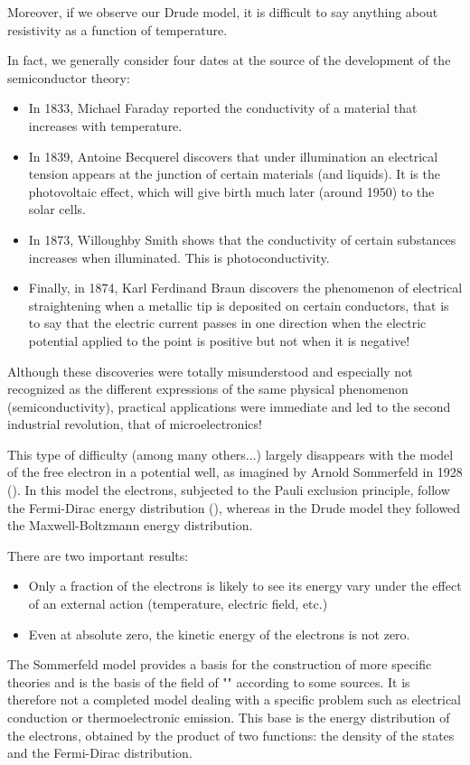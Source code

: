 	Moreover, if we observe our Drude model, it is difficult to say anything about resistivity as a function of temperature.

	In fact, we generally consider four dates at the source of the development of the semiconductor theory:
	\begin{itemize}
		\item In 1833, Michael Faraday reported the conductivity of a material that increases with temperature.

		\item In 1839, Antoine Becquerel discovers that under illumination an electrical tension appears at the junction of certain materials (and liquids). It is the photovoltaic effect, which will give birth much later (around 1950) to the solar cells.

		\item In 1873, Willoughby Smith shows that the conductivity of certain substances increases when illuminated. This is photoconductivity.

		\item Finally, in 1874, Karl Ferdinand Braun discovers the phenomenon of electrical straightening when a metallic tip is deposited on certain conductors, that is to say that the electric current passes in one direction when the electric potential applied to the point is positive but not when it is negative!
	\end{itemize}
	Although these discoveries were totally misunderstood and especially not recognized as the different expressions of the same physical phenomenon (semiconductivity), practical applications were immediate and led to the second industrial revolution, that of microelectronics!
	
	This type of difficulty (among many others...) largely disappears with the model of the free electron in a potential well, as imagined by Arnold Sommerfeld in 1928 (). In this model the electrons, subjected to the Pauli exclusion principle, follow the Fermi-Dirac energy distribution (), whereas in the Drude model they followed the Maxwell-Boltzmann energy distribution.

	There are two important results:
	\begin{itemize}
		\item Only a fraction of the electrons is likely to see its energy vary under the effect of an external action (temperature, electric field, etc.)

		\item Even at absolute zero, the kinetic energy of the electrons is not zero.
	\end{itemize}
	The Sommerfeld model provides a basis for the construction of more specific theories and is the basis of the field of "" according to some sources. It is therefore not a completed model dealing with a specific problem such as electrical conduction or thermoelectronic emission. This base is the energy distribution of the electrons, obtained by the product of two functions: the density of the states and the Fermi-Dirac distribution.
	
